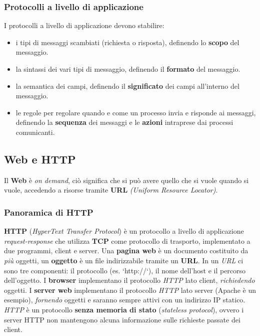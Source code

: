 \subsubsection{Protocolli a livello di applicazione}
I protocolli a livello di applicazione devono stabilire:
\begin{itemize}
\item i tipi di messaggi scambiati (richiesta o risposta), definendo lo \textbf{scopo} del messaggio.
\item la sintassi dei vari tipi di messaggio, definendo il \textbf{formato} del messaggio.
\item la semantica dei campi, definendo il \textbf{significato} dei campi all'interno del messaggio.
\item le regole per regolare quando e come un processo invia e risponde ai messaggi, definendo la \textbf{sequenza} dei messaggi e le \textbf{azioni} intraprese dai processi comunicanti.
\end{itemize}

\subsection{Web e HTTP}
Il \textbf{Web} è \textit{on demand}, ciò significa che si può avere quello che si vuole quando si vuole, accedendo a risorse tramite \textbf{URL} \textit{(Uniform Resource Locator)}.

\subsubsection{Panoramica di HTTP}
\textbf{HTTP} (\textit{HyperText Transfer Protocol}) è un protocollo a livello di applicazione \textit{request-response} che utilizza \textbf{TCP} come protocollo di trasporto, implementato a due programmi, client e server.
Una \textbf{pagina web} è un documento costituito da \textit{più} oggetti, un \textbf{oggetto} è un file indirizzabile tramite un \textbf{URL}.
In un \textit{URL} ci sono tre componenti: il protocollo (es. `http://`), il nome dell'host e il percorso dell'oggetto.
I \textbf{browser} implementano il protocollo \textit{HTTP} lato client, \textit{richiedendo} oggetti.
I \textbf{server web} implementano il protocollo \textit{HTTP} lato server (Apache è un esempio), \textit{fornendo} oggetti e saranno sempre attivi con un indirizzo IP statico.
\textit{HTTP} è un protocollo \textbf{senza memoria di stato} (\textit{stateless protocol}), ovvero i server HTTP non mantengono alcuna informazione sulle richieste passate dei client.

